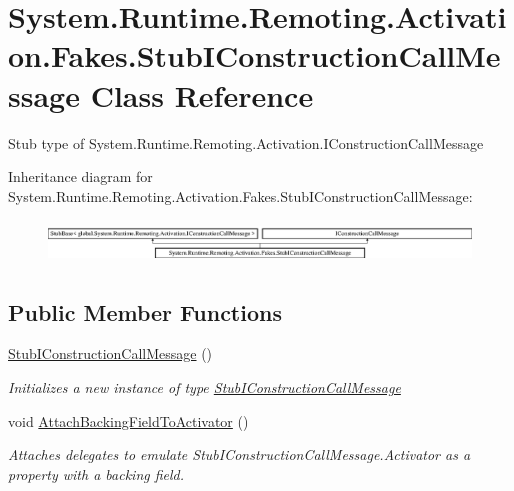 \hypertarget{class_system_1_1_runtime_1_1_remoting_1_1_activation_1_1_fakes_1_1_stub_i_construction_call_message}{\section{System.\-Runtime.\-Remoting.\-Activation.\-Fakes.\-Stub\-I\-Construction\-Call\-Message Class Reference}
\label{class_system_1_1_runtime_1_1_remoting_1_1_activation_1_1_fakes_1_1_stub_i_construction_call_message}
}


Stub type of System.\-Runtime.\-Remoting.\-Activation.\-I\-Construction\-Call\-Message 


Inheritance diagram for System.\-Runtime.\-Remoting.\-Activation.\-Fakes.\-Stub\-I\-Construction\-Call\-Message\-:\begin{figure}[H]
\begin{center}
\leavevmode
\includegraphics[height=1.145194cm]{class_system_1_1_runtime_1_1_remoting_1_1_activation_1_1_fakes_1_1_stub_i_construction_call_message}
\end{center}
\end{figure}
\subsection*{Public Member Functions}
\begin{DoxyCompactItemize}
\item 
\hyperlink{class_system_1_1_runtime_1_1_remoting_1_1_activation_1_1_fakes_1_1_stub_i_construction_call_message_a85946c658e49a0f240c31398fa00603a}{Stub\-I\-Construction\-Call\-Message} ()
\begin{DoxyCompactList}\small\item\em Initializes a new instance of type \hyperlink{class_system_1_1_runtime_1_1_remoting_1_1_activation_1_1_fakes_1_1_stub_i_construction_call_message}{Stub\-I\-Construction\-Call\-Message}\end{DoxyCompactList}\item 
void \hyperlink{class_system_1_1_runtime_1_1_remoting_1_1_activation_1_1_fakes_1_1_stub_i_construction_call_message_a76f440c8469a95b6219bb8baab6f4552}{Attach\-Backing\-Field\-To\-Activator} ()
\begin{DoxyCompactList}\small\item\em Attaches delegates to emulate Stub\-I\-Construction\-Call\-Message.\-Activator as a property with a backing field.\end{DoxyCompactList}\end{DoxyCompactItemize}

